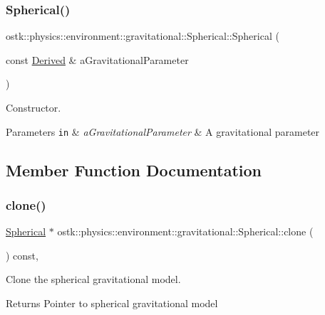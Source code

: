 \subsubsection{\texorpdfstring{Spherical()}{Spherical()}}
{\footnotesize\ttfamily ostk\+::physics\+::environment\+::gravitational\+::\+Spherical\+::\+Spherical (\begin{DoxyParamCaption}\item[{const \hyperlink{classostk_1_1physics_1_1units_1_1_derived}{Derived} \&}]{a\+Gravitational\+Parameter }\end{DoxyParamCaption})}



Constructor. 


\begin{DoxyParams}[1]{Parameters}
\mbox{\tt in}  & {\em a\+Gravitational\+Parameter} & A gravitational parameter \\
\hline
\end{DoxyParams}


\subsection{Member Function Documentation}
\mbox{\label{classostk_1_1physics_1_1environment_1_1gravitational_1_1_spherical_ac9f63de9656589a27a77e7a8d48836bd}} 
\subsubsection{\texorpdfstring{clone()}{clone()}}
{\footnotesize\ttfamily \hyperlink{classostk_1_1physics_1_1environment_1_1gravitational_1_1_spherical}{Spherical} $\ast$ ostk\+::physics\+::environment\+::gravitational\+::\+Spherical\+::clone (\begin{DoxyParamCaption}{ }\end{DoxyParamCaption}) const\hspace{0.3cm}{\ttfamily [override]}, {\ttfamily [virtual]}}



Clone the spherical gravitational model. 

\begin{DoxyReturn}{Returns}
Pointer to spherical gravitational model 
\end{DoxyReturn}


